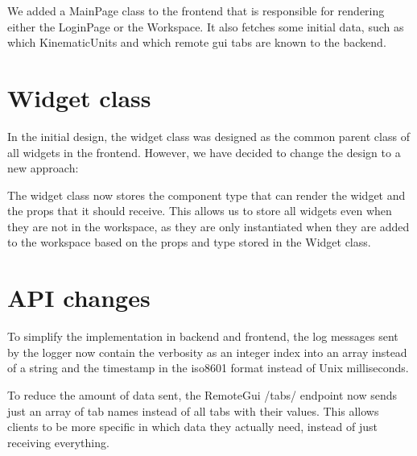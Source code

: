 We added a MainPage class to the \gls{frontend} that is responsible for rendering either the LoginPage or the Workspace.
It also fetches some initial data, such as which KinematicUnits and which remote gui tabs are known to the \gls{backend}.

\section{Widget class}

In the initial design, the widget class was designed as the common parent class of all widgets in the frontend. However, we have decided to change the design to a new approach: 

The widget class now stores the component type that can render the widget and the props that it should receive. This allows us to store all widgets even when they are not in the workspace, as they are only instantiated when they are added to the workspace based on the props and type stored in the Widget class.

\section{API changes}

To simplify the implementation in \gls{backend} and \gls{frontend}, the log messages sent by the logger now contain the verbosity as an integer index into an array instead of a string and the timestamp in the \gls{iso8601} format instead of Unix milliseconds.

To reduce the amount of data sent, the RemoteGui /tabs/ endpoint now sends just an array of tab names instead of all tabs with their values. This allows clients to be more specific in which data they actually need, instead of just receiving everything.
